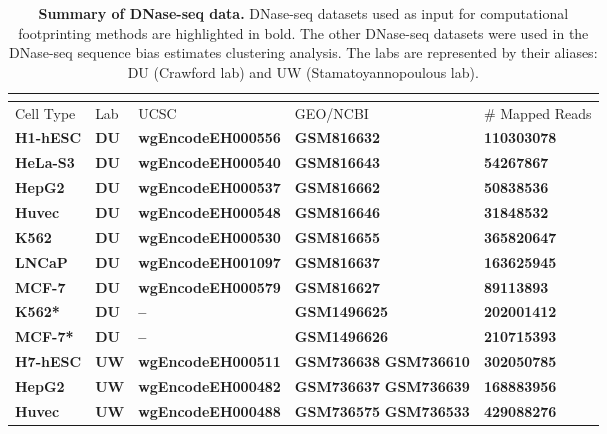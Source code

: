 \documentclass[11pt]{article}
\begin{document}
\clearpage

\begin{longtable}{p{3.5cm}p{1cm}p{4cm}p{2.8cm}p{3cm}}
\caption{\textbf{Summary of DNase-seq data.} DNase-seq datasets used as input for computational footprinting methods are highlighted in bold. The other DNase-seq datasets were used in the DNase-seq sequence bias estimates clustering analysis. The labs are represented by their aliases: DU (Crawford lab) and UW (Stamatoyannopoulous lab).} \\
\label{tab:dataencode} \\
\hline
Cell Type & Lab                 & UCSC             & GEO/NCBI                     & \# Mapped Reads \\
\hline
\textbf{H1-hESC} & \textbf{DU} & \textbf{wgEncodeEH000556} & \textbf{GSM816632} & \textbf{110303078} \\
\textbf{HeLa-S3} & \textbf{DU} & \textbf{wgEncodeEH000540} & \textbf{GSM816643} & \textbf{54267867} \\
\textbf{HepG2} & \textbf{DU} & \textbf{wgEncodeEH000537} & \textbf{GSM816662} & \textbf{50838536} \\
\textbf{Huvec} & \textbf{DU} & \textbf{wgEncodeEH000548} & \textbf{GSM816646} & \textbf{31848532} \\
\textbf{K562} & \textbf{DU} & \textbf{wgEncodeEH000530} & \textbf{GSM816655} & \textbf{365820647} \\
\textbf{LNCaP} & \textbf{DU} & \textbf{wgEncodeEH001097} & \textbf{GSM816637} & \textbf{163625945} \\
\textbf{MCF-7} & \textbf{DU} & \textbf{wgEncodeEH000579} & \textbf{GSM816627} & \textbf{89113893} \\
\textbf{K562*} & \textbf{DU} & \textbf{--} & \textbf{GSM1496625} & \textbf{202001412} \\
\textbf{MCF-7*} & \textbf{DU} & \textbf{--} & \textbf{GSM1496626} & \textbf{210715393} \\
\textbf{H7-hESC} & \textbf{UW} & \textbf{wgEncodeEH000511} & \textbf{GSM736638} \newline \textbf{GSM736610} & \textbf{302050785} \\
\textbf{HepG2} & \textbf{UW} & \textbf{wgEncodeEH000482} & \textbf{GSM736637} \newline \textbf{GSM736639} & \textbf{168883956} \\
\textbf{Huvec} & \textbf{UW} & \textbf{wgEncodeEH000488} & \textbf{GSM736575} \newline \textbf{GSM736533} & \textbf{429088276} \\

\end{longtable}
\end{document}
